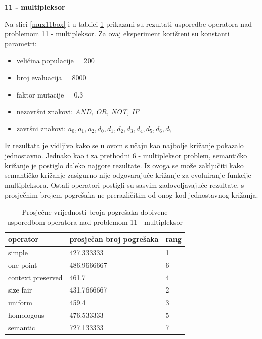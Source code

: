 \textbf{11 - multipleksor}

Na slici \ref{mux11box} i u tablici \ref{mux11table} prikazani su rezultati usporedbe operatora nad problemom 11 - multipleksor. Za ovaj eksperiment korišteni su konstanti parametri:
\begin{itemize}
\item{veličina populacije = 200}
\item{broj evaluacija = 8000}
\item{faktor mutacije = 0.3}
\item{nezavršni znakovi: \textit{AND, OR, NOT, IF}}
\item{završni znakovi: \textit{$a_0, a_1, a_2, d_0, d_1, d_2, d_3, d_4, d_5, d_6, d_7$}}
\end{itemize}

Iz rezultata je vidljivo kako se u ovom slučaju kao najbolje križanje pokazalo jednostavno. Jednako kao i za prethodni 6 - multipleksor problem, semantičko križanje je postiglo daleko najgore rezultate. Iz ovoga se može zaključiti kako semantičko križanje zasigurno nije odgovarajuće križanje za evoluiranje funkcije multipleksora. Ostali operatori postigli su sasvim zadovoljavajuće rezultate, s prosječnim brojem pogrešaka ne prerazličitim od onog kod jednostavnog križanja.

\begin{table}[H]
 	\centering
  \caption{Prosječne vrijednosti broja pogrešaka dobivene usporedbom operatora nad problemom 11 - multipleksor}
    \begin{tabular}{| l | l | l |}
    \hline
    \textbf{operator} & \textbf{prosječan broj pogrešaka} & \textbf{rang}\\ \hline
    simple & 427.333333 &1\\ \hline
    one point & 486.9666667 & 6\\ \hline
    context preserved & 461.7 & 4\\ \hline
    size fair & 431.7666667 & 2\\ \hline
    uniform & 459.4 & 3\\ \hline
    homologous & 476.533333 & 5\\ \hline
    semantic & 727.133333 & 7\\ \hline
    \end{tabular}
    
  
    \label{mux11table}
\end{table}


